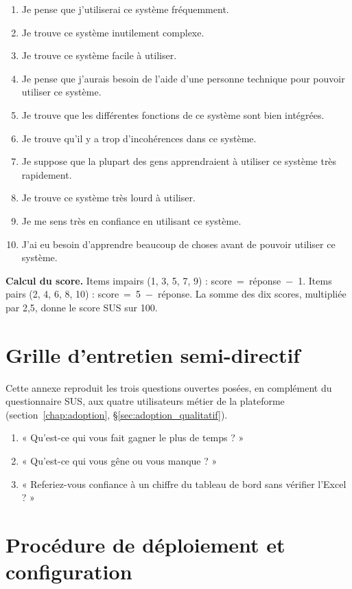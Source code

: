 \begin{enumerate}
    \item Je pense que j'utiliserai ce système fréquemment.
    \item Je trouve ce système inutilement complexe.
    \item Je trouve ce système facile à utiliser.
    \item Je pense que j'aurais besoin de l'aide d'une personne technique pour pouvoir utiliser ce système.
    \item Je trouve que les différentes fonctions de ce système sont bien intégrées.
    \item Je trouve qu'il y a trop d'incohérences dans ce système.
    \item Je suppose que la plupart des gens apprendraient à utiliser ce système très rapidement.
    \item Je trouve ce système très lourd à utiliser.
    \item Je me sens très en confiance en utilisant ce système.
    \item J'ai eu besoin d'apprendre beaucoup de choses avant de pouvoir utiliser ce système.
\end{enumerate}

\noindent\textbf{Calcul du score.} Items impairs (1, 3, 5, 7, 9) : score~=~réponse~$-$~1. Items pairs (2, 4, 6, 8, 10) : score~=~5~$-$~réponse. La somme des dix scores, multipliée par 2,5, donne le score SUS sur 100.

\chapter{Grille d'entretien semi-directif}
\label{annexe:entretien}

Cette annexe reproduit les trois questions ouvertes posées, en complément du questionnaire SUS, aux quatre utilisateurs métier de la plateforme (section~\ref{chap:adoption}, §\ref{sec:adoption_qualitatif}).

\begin{enumerate}
    \item « Qu'est-ce qui vous fait gagner le plus de temps ? »
    \item « Qu'est-ce qui vous gêne ou vous manque ? »
    \item « Referiez-vous confiance à un chiffre du tableau de bord sans vérifier l'Excel ? »
\end{enumerate}

\chapter{Procédure de déploiement et configuration}
\label{annexe:deploiement}

